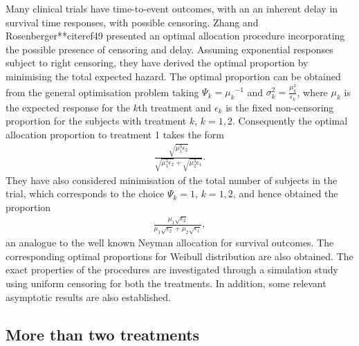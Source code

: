 Many clinical trials have time-to-event outcomes, with an an inherent delay in survival time responses, with possible censoring. Zhang and
Rosenberger**citeref{49} presented an optimal allocation procedure
incorporating the possible presence of censoring and delay.
Assuming exponential responses subject to right censoring, they have
derived the optimal proportion by minimising the total expected
hazard. The optimal proportion can be obtained from the general
optimisation problem taking $\Psi_{k}={\mu_{k}}^{-1}$ and
$\sigma_{k}^{2}=\frac{\mu_{k}^{2}}{\epsilon_{k}}$, where $\mu_{k}$
is the expected response for the $k$th treatment and $\epsilon_{k}$
is the fixed non-censoring proportion for the subjects with treatment $k$, $k=1,2$. Consequently the optimal allocation proportion to treatment 1 takes the form
\begin{eqnarray*}
\frac{\sqrt{\mu_{1}^{3}{\epsilon_{2}}}}{\sqrt{\mu_{1}^{3}{\epsilon_{2}}}+\sqrt{\mu_{2}^{3}{\epsilon_{1}}}}.
\end{eqnarray*}
They have also considered minimisation of the total number of
subjects in the trial, which corresponds to the choice $\Psi_{k}=1$, $k=1,2$, and hence obtained the proportion
\begin{eqnarray*}
\frac{\mu_{1}\sqrt{{\epsilon_{2}}}}{\mu_{1}\sqrt{{\epsilon_{2}}}+\mu_{2}\sqrt{{\epsilon_{1}}}},
\end{eqnarray*}
an analogue to the well known Neyman allocation for survival
outcomes. The corresponding optimal proportions for Weibull
distribution are also obtained. The exact properties of the
procedures are investigated through a simulation study using uniform
censoring for both the treatments. In addition, some relevant
asymptotic results are also established.

\subsection{More than two treatments}

